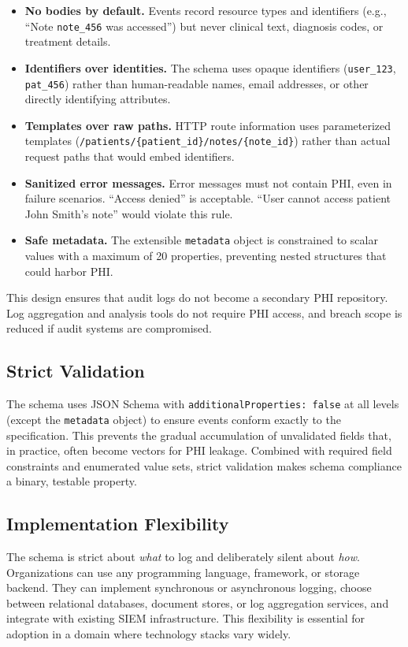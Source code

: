 \documentclass[11pt,a4paper]{article}
\begin{document}
\begin{itemize}
    \item \textbf{No bodies by default.} Events record resource types and identifiers (e.g., ``Note \texttt{note\_456} was accessed'') but never clinical text, diagnosis codes, or treatment details.
    \item \textbf{Identifiers over identities.} The schema uses opaque identifiers (\texttt{user\_123}, \texttt{pat\_456}) rather than human-readable names, email addresses, or other directly identifying attributes.
    \item \textbf{Templates over raw paths.} HTTP route information uses parameterized templates (\texttt{/patients/\{patient\_id\}/notes/\{note\_id\}}) rather than actual request paths that would embed identifiers.
    \item \textbf{Sanitized error messages.} Error messages must not contain PHI, even in failure scenarios. ``Access denied'' is acceptable. ``User cannot access patient John Smith's note'' would violate this rule.
    \item \textbf{Safe metadata.} The extensible \texttt{metadata} object is constrained to scalar values with a maximum of 20 properties, preventing nested structures that could harbor PHI.
\end{itemize}

This design ensures that audit logs do not become a secondary PHI repository. Log aggregation and analysis tools do not require PHI access, and breach scope is reduced if audit systems are compromised.

\subsection{Strict Validation}

The schema uses JSON Schema with \texttt{additionalProperties: false} at all levels (except the \texttt{metadata} object) to ensure events conform exactly to the specification. This prevents the gradual accumulation of unvalidated fields that, in practice, often become vectors for PHI leakage. Combined with required field constraints and enumerated value sets, strict validation makes schema compliance a binary, testable property.

\subsection{Implementation Flexibility}

The schema is strict about \textit{what} to log and deliberately silent about \textit{how}. Organizations can use any programming language, framework, or storage backend. They can implement synchronous or asynchronous logging, choose between relational databases, document stores, or log aggregation services, and integrate with existing SIEM infrastructure. This flexibility is essential for adoption in a domain where technology stacks vary widely.
\end{document}
